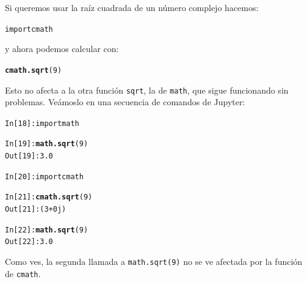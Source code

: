 \documentclass[10pt,a4paper]{article}\usepackage[]{graphicx}\usepackage[]{color}
\makeatletter
\newcommand{\hlnum}[1]{\textcolor[rgb]{0.686,0.059,0.569}{#1}}%
\newcommand{\hlstd}[1]{\textcolor[rgb]{0.345,0.345,0.345}{#1}}%
\newcommand{\hlkwd}[1]{\textcolor[rgb]{0.737,0.353,0.396}{\textbf{#1}}}%
\newenvironment{kframe}{%
 \def\at@end@of@kframe{}%
 \ifinner\ifhmode%
  \def\at@end@of@kframe{\end{minipage}}%
  \begin{minipage}{\columnwidth}%
 \fi\fi%
 \def\FrameCommand##1{\hskip\@totalleftmargin \hskip-\fboxsep
 \colorbox{shadecolor}{##1}\hskip-\fboxsep
     \hskip-\linewidth \hskip-\@totalleftmargin \hskip\columnwidth}%
 \MakeFramed {\advance\hsize-\width
   \@totalleftmargin\z@ \linewidth\hsize
   \@setminipage}}%
 {\par\unskip\endMakeFramed%
 \at@end@of@kframe}
\newenvironment{knitrout}{}{} %
\makeatother
\begin{document}
Si queremos usar la raíz cuadrada de un número complejo hacemos:
\begin{knitrout}
\color{fgcolor}\begin{kframe}
\begin{alltt}
import cmath
\end{alltt}
\end{kframe}
\end{knitrout}
y ahora podemos calcular con:
\begin{knitrout}
\color{fgcolor}\begin{kframe}
\begin{alltt}
\hlkwd{cmath.sqrt}\hlstd{(}\hlnum{9}\hlstd{)}
\end{alltt}
\end{kframe}
\end{knitrout}
Esto no afecta a la otra función {\tt sqrt}, la de {\tt math}, que sigue funcionando sin problemas. Veámoslo en una secuencia de comandos de Jupyter:
\begin{knitrout}
\color{fgcolor}\begin{kframe}
\begin{alltt}
In [18]: import math

In [19]: \hlkwd{math.sqrt}(9)
Out[19]: 3.0

In [20]: import cmath

In [21]: \hlkwd{cmath.sqrt}(9)
Out[21]: (3+0j)

In [22]: \hlkwd{math.sqrt}(9)
Out[22]: 3.0
\end{alltt}
\end{kframe}
\end{knitrout}
Como ves, la segunda llamada a {\tt math.sqrt(9)} no se ve afectada por la función de {\tt cmath}.
\end{document}
